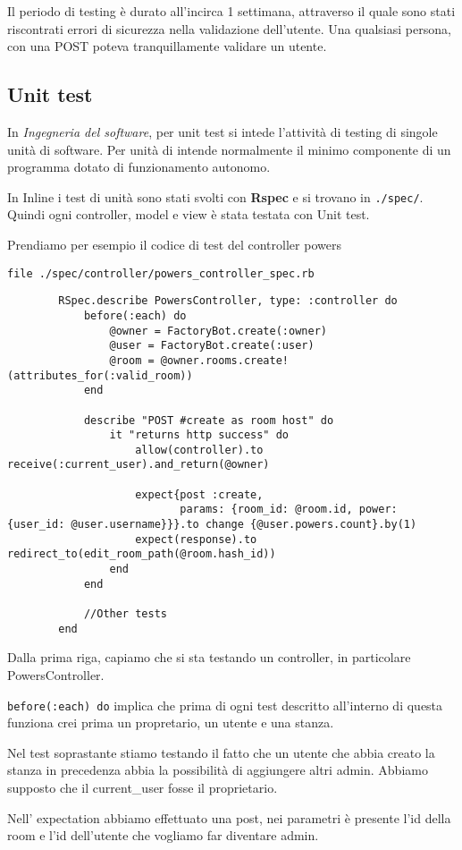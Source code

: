 	Il periodo di testing è durato all'incirca 1 settimana, attraverso il quale sono stati riscontrati errori di sicurezza nella validazione dell'utente. Una qualsiasi persona, con una POST poteva tranquillamente validare un utente.
	
	\subsection{Unit test}
	In \textit{Ingegneria del software}, per unit test si intede l'attività di testing di singole unità di software. Per unità di intende normalmente il minimo componente di un programma dotato di funzionamento autonomo.
	
	In Inline i test di unità sono stati svolti con \textbf{Rspec} e si trovano in \texttt{./spec/}. Quindi ogni controller, model e view è stata testata con Unit test.
	
	
	Prendiamo per esempio il codice di test del controller powers
	
	 \texttt{file ./spec/controller/powers\_controller\_spec.rb}
	\begin{lstlisting}
		RSpec.describe PowersController, type: :controller do
			before(:each) do
				@owner = FactoryBot.create(:owner)
				@user = FactoryBot.create(:user)
				@room = @owner.rooms.create!(attributes_for(:valid_room))
			end
			
			describe "POST #create as room host" do
				it "returns http success" do
					allow(controller).to receive(:current_user).and_return(@owner)
			
					expect{post :create, 
						   params: {room_id: @room.id, power: {user_id: @user.username}}}.to change {@user.powers.count}.by(1)
					expect(response).to redirect_to(edit_room_path(@room.hash_id))
				end
			end
			
			//Other tests
		end
	\end{lstlisting}
	
	Dalla prima riga, capiamo che si sta testando un controller, in particolare PowersController.
	
	\texttt{before(:each) do} implica che prima di ogni test descritto all'interno di questa funziona crei prima un propretario, un utente e una stanza.
	
	Nel test soprastante stiamo testando il fatto che un utente che abbia creato la stanza in precedenza abbia la possibilità di aggiungere altri admin. Abbiamo supposto che il current\_user fosse il proprietario.
	
	Nell' expectation abbiamo effettuato una post, nei parametri è presente l'id della room e l'id dell'utente che vogliamo far diventare admin.
	
